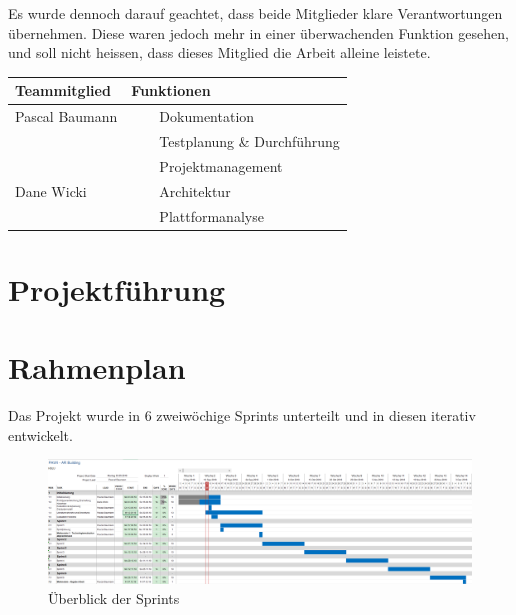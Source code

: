 \documentclass[a4paper]{scrreprt}
\newcommand{\tabitem}{~~\llap{\textbullet}~~}
\begin{document}
Es wurde dennoch darauf geachtet, dass beide Mitglieder klare Verantwortungen übernehmen. Diese waren jedoch mehr in einer überwachenden Funktion gesehen, und soll nicht heissen, dass dieses Mitglied die Arbeit alleine leistete.

\vspace{1em}

\begin{tabularx}{\textwidth}{|X|X|}
	\hline
	\textbf{Teammitglied} & \textbf{Funktionen} \\
	\hline
	Pascal Baumann & \tabitem Dokumentation \\
	& \tabitem Testplanung \& Durchführung \\
	& \tabitem Projektmanagement \\
	\hline
	Dane Wicki & \tabitem Architektur \\
	& \tabitem Plattformanalyse \\
	\hline
\end{tabularx}

\newpage
\section{Projektführung}

\section{Rahmenplan}

Das Projekt wurde in 6 zweiwöchige Sprints unterteilt und in diesen iterativ entwickelt.

\vspace{1em}

\begin{figure}[h!]
	\includegraphics[keepaspectratio, width=\textwidth]{Rahmenplan}
	\caption{Überblick der Sprints}
\end{figure}
\end{document}
